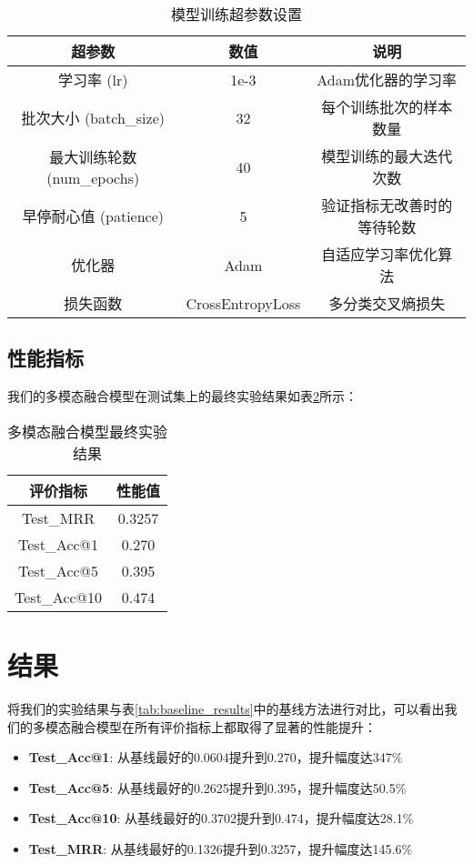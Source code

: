 \documentclass{article}
\begin{document}
\begin{table}[H]
\centering
\begin{tabular}{|c|c|c|}
\hline
\rowcolor[HTML]{D9EAD3}
\textbf{超参数} & \textbf{数值} & \textbf{说明} \\ \hline
学习率 (lr) & 1e-3 & Adam优化器的学习率 \\ \hline
批次大小 (batch\_size) & 32 & 每个训练批次的样本数量 \\ \hline
最大训练轮数 (num\_epochs) & 40 & 模型训练的最大迭代次数 \\ \hline
早停耐心值 (patience) & 5 & 验证指标无改善时的等待轮数 \\ \hline
优化器 & Adam & 自适应学习率优化算法 \\ \hline
损失函数 & CrossEntropyLoss & 多分类交叉熵损失 \\ \hline
\end{tabular}
\caption{模型训练超参数设置}
\label{tab:hyperparameters}
\end{table}

\subsection{性能指标}

我们的多模态融合模型在测试集上的最终实验结果如表\ref{tab:final_results}所示：

\begin{table}[H]
\centering
\begin{tabular}{|c|c|}
\hline
\rowcolor[HTML]{D9EAD3}
\textbf{评价指标} & \textbf{性能值} \\ \hline
Test\_MRR & 0.3257 \\ \hline
Test\_Acc@1 & 0.270 \\ \hline
Test\_Acc@5 & 0.395 \\ \hline
Test\_Acc@10 & 0.474 \\ \hline
\end{tabular}
\caption{多模态融合模型最终实验结果}
\label{tab:final_results}
\end{table}

\section{结果}

将我们的实验结果与表\ref{tab:baseline_results}中的基线方法进行对比，可以看出我们的多模态融合模型在所有评价指标上都取得了显著的性能提升：

\begin{itemize}
\item \textbf{Test\_Acc@1}: 从基线最好的0.0604提升到0.270，提升幅度达347\%
\item \textbf{Test\_Acc@5}: 从基线最好的0.2625提升到0.395，提升幅度达50.5\%
\item \textbf{Test\_Acc@10}: 从基线最好的0.3702提升到0.474，提升幅度达28.1\%
\item \textbf{Test\_MRR}: 从基线最好的0.1326提升到0.3257，提升幅度达145.6\%
\end{itemize}
\end{document}
